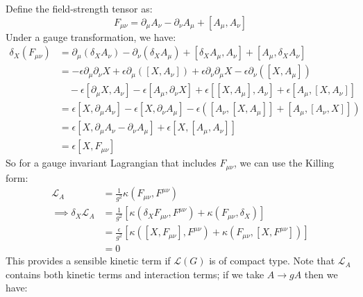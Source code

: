 \documentclass{jknotes}
\begin{document}
Define the field-strength tensor as:
\begin{equation}
    F_{\mu\nu} = \partial_\mu A_\nu - \partial_\nu A_\mu + [A_\mu,A_\nu]
\end{equation}
Under a gauge transformation, we have:
\begin{align}
    \delta_X(F_{\mu\nu}) &= \partial_\mu(\delta_XA_\nu) - \partial_\nu(\delta_XA_\mu) + [\delta_XA_\mu,A_\nu] + [A_\mu,\delta_XA_\nu] \\
    &= -\epsilon\partial_\mu\partial_\nu X + \epsilon\partial_\mu([X,A_\nu]) + \epsilon \partial_\nu\partial_\mu X - \epsilon \partial_\nu([X,A_\mu]) \\
    &\quad -\epsilon[\partial_\mu X,A_\nu] - \epsilon[A_\mu, \partial_\nu X] + \epsilon [[X,A_\mu],A_\nu] + \epsilon [A_\mu,[X,A_\nu]] \\
    &= \epsilon[X,\partial_\mu A_\nu] - \epsilon[X,\partial_\nu A_\mu] - \epsilon([A_\nu,[X,A_\mu]] + [A_\mu,[A_\nu,X]]) \\
    &= \epsilon[X,\partial_\mu A_\nu - \partial_\nu A_\mu] + \epsilon[X,[A_\mu,A_\nu]] \\
    &= \epsilon[X,F_{\mu\nu}]
\end{align}
So for a gauge invariant Lagrangian that includes \(F_{\mu\nu}\), we can use the Killing form:
\begin{align}
    \mathcal{L}_A &= \frac{1}{g^2}\kappa(F_{\mu\nu},F^{\mu\nu}) \\
    \implies \delta_X\mathcal{L}_A &= \frac{1}{g^2}[\kappa(\delta_XF_{\mu\nu},F^{\mu\nu}) + \kappa(F_{\mu\nu},\delta_X)] \\
    &= \frac{\epsilon}{g^2}[\kappa([X,F_{\mu\nu}],F^{\mu\nu}) + \kappa(F_{\mu\nu},[X,F^{\mu\nu}])] \\
    &= 0
\end{align}
This provides a sensible kinetic term if \(\mathcal{L}(G)\) is of compact type. Note that \(\mathcal{L}_A\) contains both kinetic terms and interaction terms; if we take \(A \rightarrow gA\) then we have:
\end{document}
